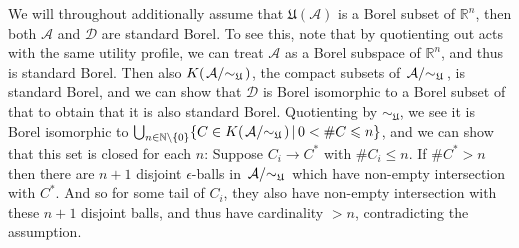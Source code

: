 \documentclass[a4paper]{article}
\newcommand{\quotient}[2]{\left.#1\middle/#2\right.}
\newcommand\A{\mathcal{A}}
\newcommand\U{\mathfrak{U}} %
\newcommand{\Decs}{\mathcal{D}}
\renewcommand{\Re}{\mathbb{R}}
\renewcommand{\color}[1]{}
\newenvironment{colored}[1]{\leavevmode\color{#1}}{}
\newcommand\SetDelimiter[1][]{
	\nonscript\,#1\vert \allowbreak \nonscript\,\mathopen{}}
\providecommand\given{\SetDelimiter}
\renewcommand{\leq}{\leqslant}
\newenvironment{CCM rewritten}
{\begingroup\color{blue}} %
{\endgroup}              %
\begin{document}
\begin{colored}{violet}
	
	We will throughout additionally assume that $\U(\A)$ is a Borel subset of $\Re^n$, then both $\A$ and $\Decs$ are standard Borel.
	 \begin{colored}{red}
	 	To see this, note that by quotienting out acts with the same utility profile, we can treat $\A$ as a Borel subspace of $\Re^n$, and thus is standard Borel. Then also $K(\quotient{\A}{\sim_\U})$, the compact subsets of $\quotient{\A}{\sim_\U}$, is standard Borel, and we can show that $\Decs$ is Borel isomorphic to a Borel subset of that to obtain that it is also standard Borel.
	 Quotienting by $\sim_\U$, we see it is Borel isomorphic to $\bigcup_{n\in\mathbb{N}\setminus\{0\}}\{C\in K(\quotient{\A}{\sim_\U})\given 0<\# C\leq n\}$, and we can show that this set is closed for each $n$: Suppose $C_i\longrightarrow C^*$ with $\# C_i\leq n$. If $\# C^* >n$ then there are $n+1$ disjoint $\epsilon$-balls in $\quotient{\A}{\sim_\U}$ which have non-empty intersection with $C^*$. And so for some tail of $C_i$, they also have non-empty intersection with these $n+1$ disjoint balls, and thus have cardinality $>n$, contradicting the assumption. 
	 \end{colored}
	

\end{colored}
\end{document}
